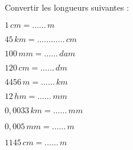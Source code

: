\begin{pageAD} 


 Convertir les longueurs suivantes :
 
\begin{enumerate} 
\begin{minipage}{0.3\linewidth}\vspace{0.2cm}
\item $1 \,cm =  \ldots\ldots \,m$ \vspace{0.2cm}
\item $45 \,km =  \ldots\ldots\ldots\ldots \,cm$\vspace{0.2cm}
\item $100 \,mm =  \ldots\ldots \,dam$\vspace{0.2cm}
\end{minipage}
 \hfill
\begin{minipage}{0.3  \linewidth}
\item $1 20 \,cm =  \ldots\ldots \,dm$\vspace{0.2cm}
\item $4456 \,m =  \ldots\ldots \,km$\vspace{0.2cm}
\item $12 \,hm =  \ldots\ldots \,mm$\vspace{0.2cm}
\end{minipage}
 \hfill
\begin{minipage}{0.3  \linewidth}
\item $0,0033 \,km =  \ldots\ldots \,mm$\vspace{0.2cm}
\item $0,005 \,mm =  \ldots\ldots \,m$\vspace{0.2cm}
\item $1145 \,cm = \ldots\ldots \,m$\vspace{0.2cm}
\end{minipage}

\end{enumerate} 
 
 
 
\begin{minipage}{.5\linewidth}
 

\end{minipage}
\end{pageAD}
